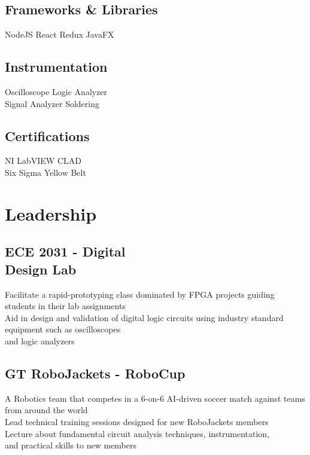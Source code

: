 \documentclass[]{deedy-resume-openfont}
\begin{document}
\begin{minipage}[t]{0.33\textwidth}
\subsection{Frameworks \& Libraries}
NodeJS \textbullet{} React \textbullet{} Redux \textbullet{} JavaFX
\sectionsep

\subsection{Instrumentation}
Oscilloscope \textbullet{}  Logic Analyzer \textbullet{} \\  Signal Analyzer \textbullet{} Soldering
\sectionsep

\subsection{Certifications}
NI LabVIEW CLAD \textbullet{}\\ 
Six Sigma Yellow Belt

\section{Leadership}
\subsection{ECE 2031 - Digital \\ Design Lab}
\textbullet{} Facilitate a rapid-prototyping class dominated by FPGA projects guiding students in their lab assignments \\
\textbullet{} Aid in design and validation of digital logic circuits using industry standard equipment such as oscilloscopes \\ and logic analyzers
\sectionsep

\subsection{GT RoboJackets - RoboCup}
\textbullet{} A Robotics team that competes in a 6-on-6 AI-driven soccer match against teams from around the world \\
\textbullet{} Lead technical training sessions designed for new RoboJackets members \\
\textbullet{} Lecture about fundamental circuit analysis techniques, instrumentation, \\
and practical skills to new members 

\sectionsep

%
%

\end{minipage} 
\end{document}
